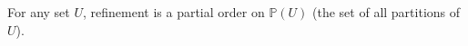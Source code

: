 For any set $U$, refinement is a partial order on $\mathbb{P}(U)$ (the set of all partitions of $U$).
